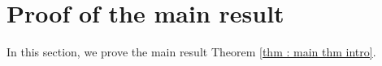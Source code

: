 \documentclass[12pt]{amsart}
\theoremstyle{plain}
\theoremstyle{definition}
\numberwithin{equation}{section}
\begin{document}


\section{Proof of the main result}
\label{sec : proof of the main result}

In this section, we prove the main result Theorem \ref{thm : main thm intro}.
\end{document}

